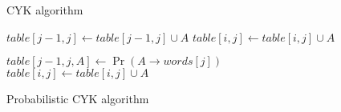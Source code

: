 \documentclass[9pt]{extarticle}
\begin{document}
\begin{figure}[]
  \centering
  \begin{minipage}{.47\textwidth}
    \begin{algorithm}[H]
      \caption{CYK algorithm}
      \begin{algorithmic}[1]
            \State $table[j-1,j] \gets table[j-1,j] \cup A$
          \EndFor
                \State $table[i,j] \gets table[i,j] \cup A$
              \EndFor
            \EndFor
          \EndFor
        \EndFor
      \end{algorithmic}
    \end{algorithm}
%
  \end{minipage}%
  \begin{minipage}{.47\textwidth}
    \begin{algorithm}[H]
      \caption{Probabilistic CYK algorithm}
      \begin{algorithmic}[1]
          \State $table[j-1,j, A] \gets \Pr(A \rightarrow words[j])$
          \EndFor
                \State $table[i,j] \gets table[i,j] \cup A$
              \EndFor
            \EndFor
          \EndFor
        \EndFor
      \end{algorithmic}
    \end{algorithm}
  \end{minipage}
\end{figure}
\end{document}
